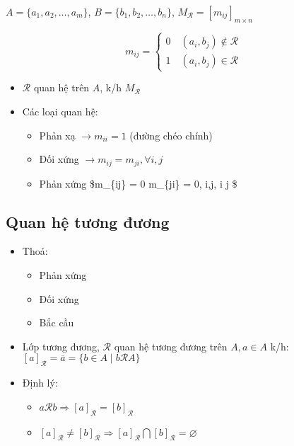 \documentclass[11pt]{article}
\begin{document}
    \(A=\{ a_1, a_2, \ldots , a_m \}\),
\(B = \{ b_1, b_2 , \ldots , b_n \}\),
\(M_{\mathcal{R}} = [m_{ij}]_{m\times n}\)

\[
m_{ij} = \begin{cases} 0 \quad (a_i,b_j) \notin \mathcal{R} \\ 1 \quad (a_i,b_j) \in \mathcal{R} \end{cases}
\]

    \begin{itemize}
\item
  \(\mathcal{R}\) quan hệ trên \(A\), k/h \(M_{\mathcal{R}}\)
\item
  Các loại quan hệ:

  \begin{itemize}
  \item
    Phản xạ \(\to m_{ii} = 1\) (đường chéo chính)
  \item
    Đối xứng \(\to m_{ij} = m_{ji}, \forall i,j\)
  \item
    Phản xứng \$\to m\_\{ij\} = 0 \lor m\_\{ji\} = 0, \forall i,j, i
    \neq j \$
  \end{itemize}
\end{itemize}

    \subsection{Quan hệ tương
đương}\label{quan-hux1ec7-tux1b0ux1a1ng-ux111ux1b0ux1a1ng}

    \begin{itemize}
\item
  Thoả:

  \begin{itemize}
  \item
    Phản xứng
  \item
    Đối xứng
  \item
    Bắc cầu
  \end{itemize}
\item
  Lớp tương đương, \(\mathcal{R}\) quan hệ tương đương trên
  \(A, a \in A\) k/h:
  \([a]_{\mathcal{R}} = \overline{a} = \{ b \in A \mid b \mathcal{R} A \}\)
\item
  Định lý:

  \begin{itemize}
  \item
    \(a \mathcal{R} b \Rightarrow [a]_{\mathcal{R}} = [b]_{\mathcal{R}}\)
  \item
    \([a]_{\mathcal{R}} \neq [b]_{\mathcal{R}} \Rightarrow [a]_{\mathcal{R}} \bigcap [b]_{\mathcal{R}} = \varnothing\)
  \end{itemize}
\end{itemize}
\end{document}
